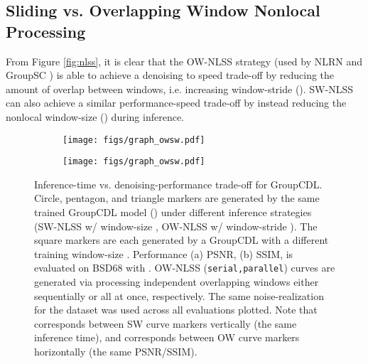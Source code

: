 \documentclass[lettersize,journal]{IEEEtran}
\begin{document}
\subsection{Sliding vs. Overlapping Window Nonlocal Processing} \label{sec:exp:slidingwindow}
From Figure \ref{fig:nlss}, it is clear that the OW-NLSS strategy 
(used by NLRN \cite{liu2018non} and GroupSC \cite{lecouat2020nonlocal})
is able to achieve a denoising to speed trade-off by reducing the amount of overlap between windows, i.e.
increasing window-stride (). SW-NLSS can also achieve a similar performance-speed trade-off by instead 
reducing the nonlocal window-size () during inference.
\begin{figure}[thb]
    \centering
    \begin{subfigure}{0.4\textwidth}
        \centering
        \texttt{[image: figs/graph\_owsw.pdf]}
    \end{subfigure}
    \hfill 
    \begin{subfigure}{0.4\textwidth}
        \centering
        \texttt{[image: figs/graph\_owsw.pdf]}
    \end{subfigure}
    \caption{
    Inference-time vs. denoising-performance trade-off for GroupCDL. 
    Circle, pentagon, and triangle markers are generated by the same trained GroupCDL model () 
    under different inference strategies (SW-NLSS w/ window-size , OW-NLSS w/ window-stride ). The square markers are each generated by a GroupCDL with a different training window-size . 
    Performance (a) PSNR, (b) SSIM,
    is evaluated on BSD68 \cite{bsd} with . OW-NLSS
    (\texttt{serial,parallel}) curves are generated via processing independent overlapping
    windows either sequentially or all at once, respectively. The same
    noise-realization for the dataset was used across all evaluations plotted.
    Note that  corresponds between SW curve markers vertically (the same inference time), 
    and  corresponds between OW curve markers horizontally (the same PSNR/SSIM).
    }
    \label{fig:owsw_curves}
\end{figure}\let\myfig\undefined
\newcommand{\myfig}[3]{\begin{subfigure}{0.24\linewidth}
    \centering
    \texttt{[image: \#1]}
    \caption{#3}
\end{subfigure}}
\end{document}

